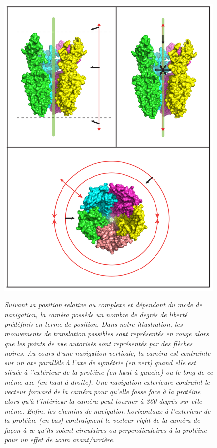 

\begin{figure}[h]
  \centering
  {\includegraphics[width=.5\linewidth]{./figures/ch3/degree_of_freedom_glic}}
    \caption[Représentation des chemins de navigation générés en exploration externe et interne d'un complexe moléculaire.]{{\it Suivant sa position relative au complexe et dépendant du mode de navigation, la caméra possède un nombre de degrés de liberté prédéfinis en terme de position. Dans notre illustration, les mouvements de translation possibles sont représentés en rouge alors que les points de vue autorisés sont représentés par des flèches noires. Au cours d'une navigation verticale, la caméra est contrainte sur un axe parallèle à l'axe de symétrie (en vert) quand elle est située à l'extérieur de la protéine (en haut à gauche) ou le long de ce même axe (en haut à droite). Une navigation extérieure contraint le vecteur forward de la caméra pour qu'elle fasse face à la protéine alors qu'à l'intérieur la caméra peut tourner à 360 degrés sur elle-même. Enfin, les chemins de navigation horizontaux à l'extérieur de la protéine (en bas) contraignent le vecteur right de la caméra de façon à ce qu'ils soient circulaires ou perpendiculaires à la protéine pour un effet de zoom avant/arrière.}}
  \label{Fig:degree_of_freedom_glic}
  \hspace{0.2cm}
\end{figure}


